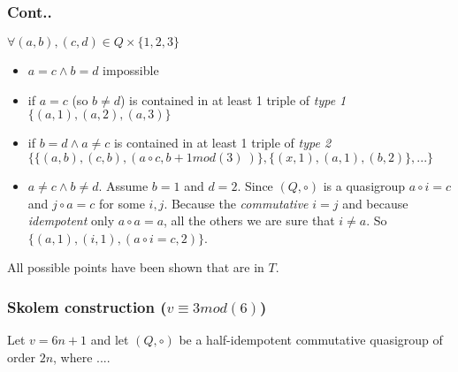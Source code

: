 \begin{frame}
\frametitle{Cont..}
$\forall (a,b),(c,d) \in Q \times \{1,2,3\}$
\begin{itemize}
	\item $a=c \wedge b=d$ impossible
	\item if $a=c$ (so $b\not = d$) is contained in at least 1 triple of \textit{type 1} $\{(a,1),(a,2),(a,3)\}$
	\item if $b=d \wedge a \not = c$ is contained in at least 1 triple of \textit{type 2} $\{\{(a,b),(c,b),(a \circ c, b+1 mod(3)\ )\}, \{(x,1),(a,1),(b,2)\}, ... \}$
	\item $a \not = c \wedge b \not = d$.%
	Assume $b=1$ and $d=2$. Since $(Q,\circ)$ is a quasigroup $a \circ i = c$ and $j \circ a = c$ for some $i,j$. Because the \textit{commutative} $i=j$ and because \textit{idempotent} only $a \circ a=a$, all the others we are sure that $i\not = a$. So $\{(a,1),(i,1),(a \circ i = c, 2)\}$.
\end{itemize}

All possible points have been shown that are in $T$.
\end{frame}

\begin{frame}
\frametitle{Skolem construction ($v \equiv 3 mod(6)$)}
Let $v = 6n +1$ and let $(Q, \circ)$ be a half-idempotent commutative quasigroup of order $2n$, where ....
\end{frame}




